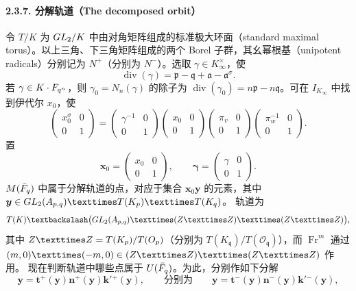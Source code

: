\paragraph*{2.3.7. 分解轨道（The decomposed orbit）}
令 $T/K$ 为 $GL_2/K$ 中由对角矩阵组成的标准极大环面（standard maximal torus）。以上三角、下三角矩阵组成的两个 Borel 子群，其幺幂根基（unipotent radicals）分别记为
$N^+$（分别为 $N^-$）。选取 $\gamma\in K_\infty^\times$，使
\[
\operatorname{div}(\gamma)=\mathfrak p-\mathfrak q+\mathfrak a-\mathfrak a^\sigma.
\]
若 $\gamma\in K\cdot F_{q^n}$，则 $\gamma_0=N_n(\gamma)$ 的除子为
$\operatorname{div}(\gamma_0)=n\mathfrak p-n\mathfrak q$。可在 $I_{K_\infty}$ 中找到伊代尔 $x_0$，使
\[
\begin{pmatrix}x_0^\sigma&0\\0&1\end{pmatrix}
=\begin{pmatrix}\gamma^{-1}&0\\0&1\end{pmatrix}
\begin{pmatrix}x_0&0\\0&1\end{pmatrix}
\begin{pmatrix}\pi_v&0\\0&1\end{pmatrix}
\begin{pmatrix}\pi_w^{-1}&0\\0&1\end{pmatrix}.
\]
置
\[
\boldsymbol x_0=\begin{pmatrix}x_0&0\\0&1\end{pmatrix},\qquad
\boldsymbol\gamma=\begin{pmatrix}\gamma&0\\0&1\end{pmatrix}.
\]
$M(\bar{F}_q)$ 中属于分解轨道的点，对应于集合
$\boldsymbol x_0\boldsymbol y$ 的元素，其中
$\boldsymbol y\in\GL_2(A_{\mathfrak p,\mathfrak q})\times T(K_{\mathfrak p})\times T(K_{\mathfrak q})$。
轨道为
\[
T(K)\backslash\bigl(\GL_2(A_{\mathfrak p,\mathfrak q})\times(\Z\times\Z)\times(\Z\times\Z)\bigr),
\]
其中 $\Z\times\Z=T(K_{\mathfrak p})/T(\mathcal O_{\mathfrak p})$（分别为
$T(K_{\mathfrak q})/T(\mathcal O_{\mathfrak q})$），而
$\operatorname{Fr}^m$ 通过 $(m,0)\times(-m,0)\in(\Z\times\Z)\times(\Z\times\Z)$ 作用。
现在判断轨道中哪些点属于 $U(\bar{F}_q)$。为此，分别作如下分解
\[
\boldsymbol y=\boldsymbol t^+(\boldsymbol y)\boldsymbol n^+(\boldsymbol y)
\boldsymbol k'{}^+(\boldsymbol y),
\qquad\text{分别为}\qquad
\boldsymbol y=\boldsymbol t^-(\boldsymbol y)\boldsymbol n^-(\boldsymbol y)
\boldsymbol k'{}^-(\boldsymbol y),
\]
